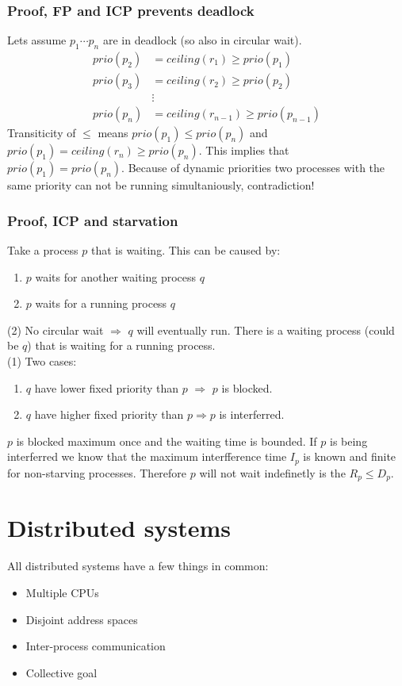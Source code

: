 \documentclass[course, english]{Notes}
\begin{document}
\subsubsection{Proof, FP and ICP prevents deadlock}
Lets assume $p_1 \cdots p_n$ are in deadlock (so also in circular wait).\\
\begin{align}
prio(p_2) &= ceiling(r_1) \geq prio(p_1) \\
prio(p_3) &= ceiling(r_2) \geq prio(p_2) \\
&\vdots \\
prio(p_n) &= ceiling(r_{n-1}) \geq prio(p_{n-1})
	\label{A}
\end{align}
Transiticity of $\leq$ means $prio(p_1) \leq prio(p_n)$ and  
$prio(p_1)=ceiling(r_n)\geq prio(p_n)$. This implies that $prio(p_1) =
prio(p_n)$. Because of dynamic priorities two processes with the same priority
can not be running simultaniously, contradiction!

\subsubsection{Proof, ICP and starvation}
Take a process $p$ that is waiting. This can be caused by:
\begin{enumerate}
	\item $p$ waits for another waiting process $q$
	\item $p$ waits for a running process $q$
		
\end{enumerate}
(2) No circular wait $\Rightarrow$ $q$ will eventually run. There is a waiting
process (could be $q$) that is waiting for a running process.\\
(1) Two cases:
\begin{enumerate}
	\item $q$ have lower fixed priority than $p$ $\Rightarrow$ $p$ is
		blocked.
	\item $q$ have higher fixed priority than $p \Rightarrow p$ is
		interferred.
\end{enumerate}
$p$ is blocked maximum once and the waiting time is bounded. If $p$ is being
interferred we know that the maximum interfference time $I_p$ is known and
finite for non-starving processes. Therefore $p$ will not wait indefinetly is
the $R_p \leq D_p$.

\section{Distributed systems}
All distributed systems have a few things in common:
\begin{itemize}
	\item Multiple CPUs
	\item Disjoint address spaces
	\item Inter-process communication
	\item Collective goal
\end{itemize}
\end{document}
